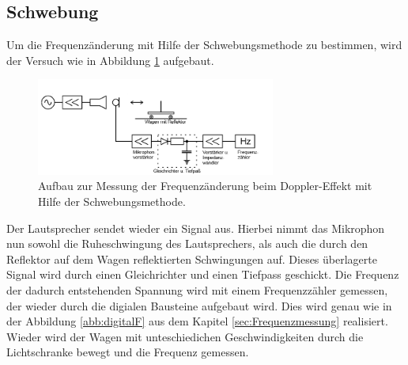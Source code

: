\subsection{Schwebung}
\label{sec:Schwebung}
Um die Frequenzänderung mit Hilfe der Schwebungsmethode
zu bestimmen, wird der Versuch wie in Abbildung \ref{abb:Schwebung}
aufgebaut.
\begin{figure}
\centering
\includegraphics[width=0.7\textwidth]{Schwebung.PNG}
\caption{Aufbau zur Messung der Frequenzänderung beim Doppler-Effekt mit Hilfe der Schwebungsmethode.\cite{skript}}
\label{abb:Schwebung}
\end{figure}
Der Lautsprecher sendet wieder ein Signal aus.
Hierbei nimmt das Mikrophon nun sowohl die
Ruheschwingung des Lautsprechers, als
auch die durch den Reflektor auf dem
Wagen reflektierten Schwingungen auf.
Dieses überlagerte Signal wird durch einen Gleichrichter
und einen Tiefpass geschickt. Die Frequenz der dadurch
entstehenden Spannung wird mit einem Frequenzzähler
gemessen, der wieder durch die digialen Bausteine
aufgebaut wird. Dies wird genau wie in der Abbildung
 \ref{abb:digitalF} aus dem Kapitel \ref{sec:Frequenzmessung} realisiert.
Wieder wird der Wagen mit unteschiedichen Geschwindigkeiten
durch die Lichtschranke bewegt und die Frequenz gemessen.
